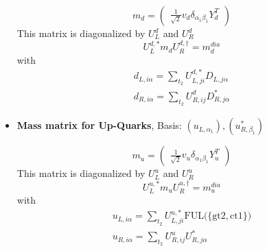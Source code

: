 \begin{itemize}
\begin{equation} 
m_{d} = \left( 
\begin{array}{c}
\frac{1}{\sqrt{2}} v_d \delta_{{\alpha_1} {\beta_1}} Y_{d}^{T} \end{array} 
\right) 
 \end{equation} 
This matrix is diagonalized by \(U^d_L\) and \(U^d_R\) 
\begin{equation} 
U^{d,*}_L m_{d} U_{R}^{d,\dagger} = m^{dia}_{d} 
\end{equation} 
with 
\begin{align} 
d_{L,{i \alpha}} = \sum_{t_2}U^{d,*}_{L,{j i}}D_{L,{j \alpha}}\\ 
d_{R,{i \alpha}} = \sum_{t_2}U_{R,{i j}}^{d}D^*_{R,{j \alpha}}
\end{align} 
\item {\bf Mass matrix for Up-Quarks}, Basis: \( \left(u_{L,{{\alpha_1}}}\right), \left(u^*_{R,{{\beta_1}}}\right) \) 
 
\begin{equation} 
m_{u} = \left( 
\begin{array}{c}
\frac{1}{\sqrt{2}} v_u \delta_{{\alpha_1} {\beta_1}} Y_{u}^{T} \end{array} 
\right) 
 \end{equation} 
This matrix is diagonalized by \(U^u_L\) and \(U^u_R\) 
\begin{equation} 
U^{u,*}_L m_{u} U_{R}^{u,\dagger} = m^{dia}_{u} 
\end{equation} 
with 
\begin{align} 
u_{L,{i \alpha}} = \sum_{t_2}U^{u,*}_{L,{j i}}\text{FUL}\Big(\{\text{gt2},\text{ct1}\}\Big)\\ 
u_{R,{i \alpha}} = \sum_{t_2}U_{R,{i j}}^{u}U^*_{R,{j \alpha}}
\end{align} 
\end{itemize} 
